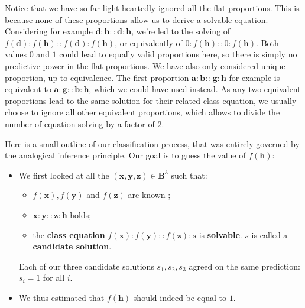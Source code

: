 Notice that we have so far light-heartedly ignored  all the flat proportions.
This is because none of these proportions allow us to derive a solvable
equation. Considering for example $\mathbf{d} : \mathbf{h} :: \mathbf{d} :
\mathbf{h}$, we're led to the solving of $f(\mathbf{d}) : f(\mathbf{h}) ::
f(\mathbf{d}) : f(\mathbf{h})$, or equivalently of $0 : f(\mathbf{h}) :: 0 :
f(\mathbf{h})$. Both values $0$ and $1$ could lead to equally valid proportions
here, so there is simply no predictive power in the flat proportions. We have
also only considered unique proportion, up to equivalence. The first proportion
$\mathbf{a} : \mathbf{b} :: \mathbf{g} : \mathbf{h}$ for example is equivalent
to $\mathbf{a} : \mathbf{g} :: \mathbf{b} : \mathbf{h}$, which we could have
used instead. As any two equivalent proportions lead to the same solution for
their related class equation, we usually choose to ignore all other equivalent
proportions, which allows to divide the number of equation solving by a factor
of $2$.

Here is a small outline of our classification process, that was entirely
governed by the analogical inference principle. Our goal is to guess the value
of $f(\mathbf{h})$:

\begin{itemize}
  \item We first looked at all the $(\mathbf{x}, \mathbf{y}, \mathbf{z}) \in
    \mathbf{B}^3$ such that:
    \begin{itemize}
      \item $f(\mathbf{x}), f(\mathbf{y})$ and $f(\mathbf{z})$ are known ;
      \item $\mathbf{x}:\mathbf{y}::\mathbf{z}:\mathbf{h}$ holds;
      \item the \textbf{class equation} $f(\mathbf{x}) :f(\mathbf{y}) ::
        f(\mathbf{z}) :s$ is \textbf{solvable}. $s$ is called a
        \textbf{candidate solution}.
    \end{itemize}
    Each of our three candidate solutions $s_1, s_2, s_3$ agreed on the same prediction:
    $s_i = 1$ for all $i$.
  \item We thus estimated that $f(\mathbf{h})$ should indeed be equal to $1$.
\end{itemize}

